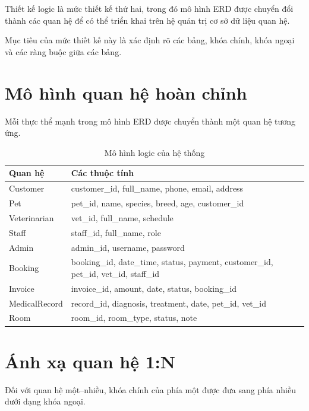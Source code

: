 Thiết kế logic là mức thiết kế thứ hai, trong đó mô hình ERD được chuyển đổi thành các quan hệ để có thể triển khai trên hệ quản trị cơ sở dữ liệu quan hệ.

Mục tiêu của mức thiết kế này là xác định rõ các bảng, khóa chính, khóa ngoại và các ràng buộc giữa các bảng.

\section{Mô hình quan hệ hoàn chỉnh}

Mỗi thực thể mạnh trong mô hình ERD được chuyển thành một quan hệ tương ứng.

\begin{table}[htbp]
    \centering
    \caption{Mô hình logic của hệ thống}
    \label{tab:relational_schema}
    \begin{tabularx}{\textwidth}{|p{3cm}|X|}
        \hline
        \textbf{Quan hệ} & \textbf{Các thuộc tính} \\ \hline
        Customer &
        customer\_id, full\_name, phone, email, address \\ \hline
        Pet &
        pet\_id, name, species, breed, age, customer\_id \\ \hline
        Veterinarian &
        vet\_id, full\_name, schedule \\ \hline
        Staff &
        staff\_id, full\_name, role \\ \hline
        Admin &
        admin\_id, username, password \\ \hline
        Booking &
        booking\_id, date\_time, status, payment, customer\_id, pet\_id, vet\_id, staff\_id \\ \hline
        Invoice &
        invoice\_id, amount, date, status, booking\_id \\ \hline
        MedicalRecord &
        record\_id, diagnosis, treatment, date, pet\_id, vet\_id \\ \hline
        Room &
        room\_id, room\_type, status, note \\ \hline
    \end{tabularx}
\end{table}

\section{Ánh xạ quan hệ 1:N}

Đối với quan hệ một--nhiều, khóa chính của phía một được đưa sang phía nhiều dưới dạng khóa ngoại.

